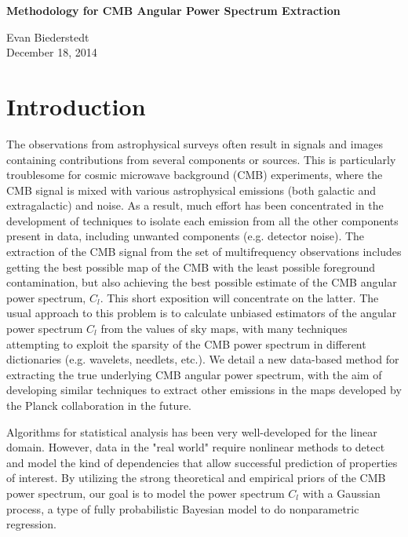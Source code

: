 \documentclass[12pt]{article}
\def\Title#1{\begin{center} {\Large {\bf #1} } \end{center}}
\begin{document}
\Title{Methodology for CMB Angular Power Spectrum Extraction}

\bigskip


\begin{raggedright}  


Evan Biederstedt\\
December 18, 2014
\bigskip
\end{raggedright}





\section{Introduction}

The observations from astrophysical surveys often result in signals and images containing contributions from several components or sources. This is particularly troublesome for cosmic microwave background (CMB) experiments, where the CMB signal is mixed with various astrophysical emissions (both galactic and extragalactic) and noise. As a result, much effort has been concentrated in the development of techniques to isolate each emission from all the other components present in data, including unwanted components (e.g. detector noise). The extraction of the CMB signal from the set of multifrequency observations includes getting the best possible map of the CMB with the least possible foreground contamination, but also achieving the best possible estimate of the CMB angular power spectrum, $C_l$. This short exposition will concentrate on the latter. The usual approach to this problem is to calculate unbiased estimators of the angular power spectrum $C_l$ from the values of sky maps, with many techniques attempting to exploit the sparsity of the CMB power spectrum in different dictionaries (e.g. wavelets, needlets, etc.). We detail a new data-based method for extracting the true underlying CMB angular power spectrum, with the aim of developing similar techniques to extract other emissions in the maps developed by the Planck collaboration in the future.

Algorithms for statistical analysis has been very well-developed for the linear domain. However, data in the "real world" require nonlinear methods to detect and model the kind of dependencies that allow successful prediction of properties of interest. By utilizing the strong theoretical and empirical priors of the CMB power spectrum, our goal is to model the power spectrum $C_l$ with a Gaussian process, a type of fully probabilistic Bayesian model to do nonparametric regression.
\end{document}
